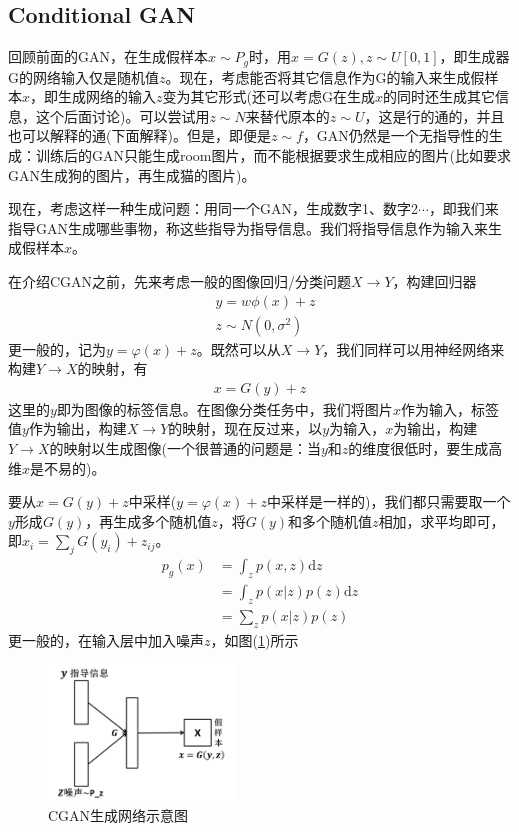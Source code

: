     \subsection{Conditional GAN}
        \par
        回顾前面的GAN，在生成假样本$x\sim P_g$时，用$x = G(z),z\sim U[0,1]$，即生成器G的网络输入仅是随机值$z$。现在，考虑能否将其它信息作为G的输入来生成假样本$x$，即生成网络的输入$z$变为其它形式(还可以考虑G在生成$x$的同时还生成其它信息，这个后面讨论)。可以尝试用$z\sim N$来替代原本的$z\sim U$，这是行的通的，并且也可以解释的通(下面解释)。但是，即便是$z\sim f$，GAN仍然是一个无指导性的生成：训练后的GAN只能生成room图片，而不能根据要求生成相应的图片(比如要求GAN生成狗的图片，再生成猫的图片)。
        \par
        现在，考虑这样一种生成问题：用同一个GAN，生成数字1、数字2$\cdots$，即我们来指导GAN生成哪些事物，称这些指导为指导信息。我们将指导信息作为输入来生成假样本$x$。
        \par
        在介绍CGAN之前，先来考虑一般的图像回归/分类问题$X\to Y$，构建回归器
        \begin{align*}
        & y = w \phi(x)+z\\
        & z\sim N(0,\sigma^2)
        \end{align*}
        更一般的，记为$y = \varphi(x)+z$。既然可以从$X\to Y$，我们同样可以用神经网络来构建$Y\to X$的映射，有
        \begin{align*}
        x = G(y)+z
        \end{align*}
        这里的$y$即为图像的标签信息。在图像分类任务中，我们将图片$x$作为输入，标签值$y$作为输出，构建$X\to Y$的映射，现在反过来，以$y$为输入，$x$为输出，构建$Y\to X$的映射以生成图像(一个很普通的问题是：当$y$和$z$的维度很低时，要生成高维$x$是不易的)。
        \par
        要从$x = G(y)+z$中采样($y = \varphi(x)+z$中采样是一样的)，我们都只需要取一个$y$形成$G(y)$，再生成多个随机值$z$，将$G(y)$和多个随机值$z$相加，求平均即可，即$x_i = \sum_{j}G(y_i)+z_{ij} $。
        \begin{align*}
        p_g(x) & = \int _z p(x,z)\mathrm{d}z\\
        & =\int_z p(x|z)p(z)\mathrm{d}z\\
        & =\sum_zp(x|z)p(z)
        \end{align*}
        更一般的\cite{2014.Mirza}，在输入层中加入噪声$z$，如图(\ref{fig:CGAN生成网络示意图})所示
                \begin{figure}[H]
                \centering
                \includegraphics[width=5cm]{images/CGAN_product_network.jpg}
                \caption{CGAN生成网络示意图}
                \label{fig:CGAN生成网络示意图}
                \end{figure}
